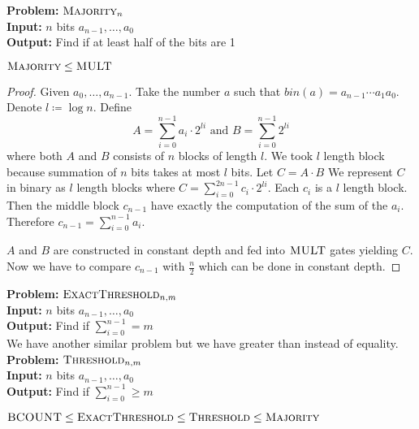 \textbf{Problem:} $\textsc{Majority}_n$\\
\textbf{Input:} $n$ bits $a_{n-1},\dots, a_0$\\
\textbf{Output:} Find if at least half of the bits are 1\parinn

\begin{theorem}\label{majmultrel}
	$\textsc{Majority}\leq \textsc{MULT}$
\end{theorem}
\begin{proof}
	Given $a_0,\dots,a_{n-1}$. Take the number $a$ such that $bin(a)=a_{n-1}\cdots a_1a_0$. Denote $l\coloneqq \log n$. Define $$A=\sum\limits_{i=0}^{n-1}a_i\cdot 2^{li}\text{ and }B=\sum\limits_{i=0}^{n-1}2^{li}$$where both $A$ and $B$ consists of $n$ blocks of length $l$. We took $l$ length block because summation of $n$ bits takes at most $l$ bits. Let $C=A\cdot B$ We represent $C$ in binary as $l$ length blocks where  $C=\sum\limits_{i=0}^{2n-1}c_i\cdot 2^{li}$. Each $c_i$ is a $l$ length block. Then the middle block $c_{n-1}$ have exactly the computation of the sum of the $a_i$. Therefore $c_{n-1}=\sum\limits_{i=0}^{n-1}a_i$.
	
	$A$ and $B$ are constructed in constant depth and fed into $\textsc{MULT}$ gates yielding $C$. Now we have to compare $c_{n-1}$ with $\frac{n}{2}$ which can be done in constant depth.
\end{proof}\parinf

\textbf{Problem:} $\textsc{ExactThreshold}_{n,m}$\\
\textbf{Input:} $n$ bits $a_{n-1},\dots, a_0$\\
\textbf{Output:} Find if $\sum\limits_{i=0}^{n-1}= m$\\[2mm]
We have another similar problem but we have greater than instead of equality.\\[2mm]
\textbf{Problem:} $\textsc{Threshold}_{n,m}$\\
\textbf{Input:} $n$ bits $a_{n-1},\dots, a_0$\\
\textbf{Output:} Find if $\sum\limits_{i=0}^{n-1}\geq m$\parinn

\begin{theorem}\label{bcthmajrel}
	$\textsc{BCOUNT}\leq \textsc{ExactThreshold}\leq \textsc{Threshold}\leq \textsc{Majority}$
\end{theorem}

